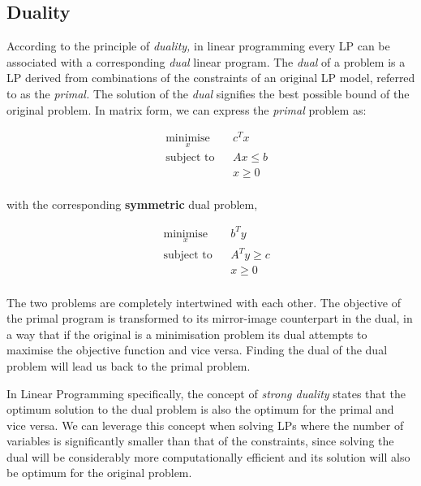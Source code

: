 
\subsection*{Duality}
\label{section: Duality}

According to the principle of \textit{duality, }in linear programming every LP can be associated with a corresponding \textit{dual} linear program. The \textit{dual} of a problem is a LP derived from combinations of the constraints of an original LP model, referred to as the \textit{primal.} The solution of the \textit{dual} signifies the best possible bound of the original problem. In matrix form, we can express the \textit{primal} problem as:\par

\vspace{\baselineskip}
\begin{equation*}
\begin{aligned}
& \underset{x}{\text{minimise}}
& & c^{T}x \\
& \text{subject to}
& & Ax \leq b\\
& & & x \geq 0 \\\
\end{aligned}
\end{equation*}

\noindent
with the corresponding \textbf{symmetric} dual problem,\par

\vspace{\baselineskip}
\begin{equation*}
\begin{aligned}
& \underset{x}{\text{minimise}}
& & b^{T}y \\
& \text{subject to}
& & A^{T}y \geq c\\
& & & x \geq 0 \\\
\end{aligned}
\end{equation*}

\noindent
The two problems are completely intertwined with each other. The objective of the primal program is transformed to its mirror-image counterpart in the dual, in a way that if the original is a minimisation problem its dual attempts to maximise the objective function and vice versa. Finding the dual of the dual problem will lead us back to the primal problem. \par
\vspace{\baselineskip}
\noindent
In Linear Programming specifically, the concept of \textit{strong duality }states that the optimum solution to the dual problem is also the optimum for the primal and vice versa. We can leverage this concept when solving LPs where the number of variables is significantly smaller than that of the constraints, since solving the dual will be considerably more computationally efficient and its solution will also be optimum for the original problem. \par


